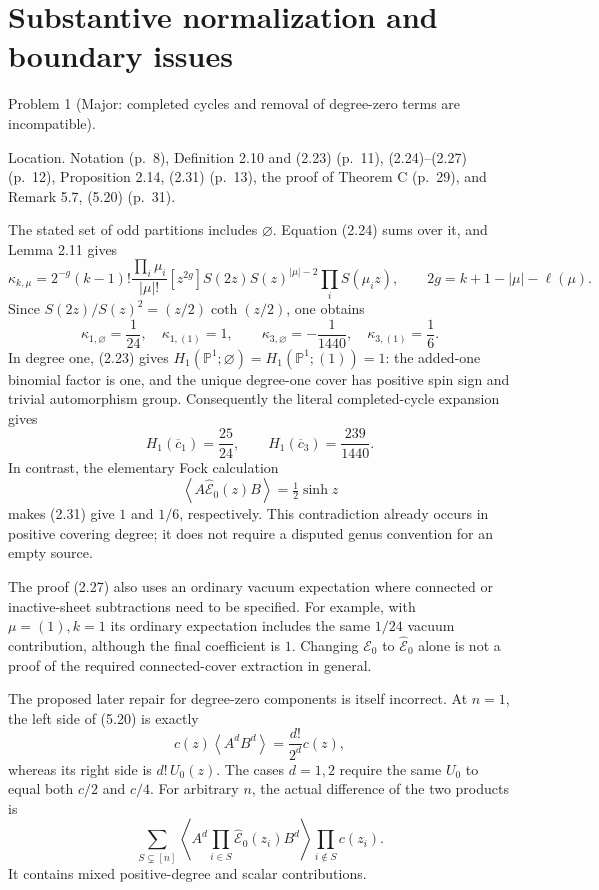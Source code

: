 \documentclass[10pt]{article}
\begin{document}
\section*{Substantive normalization and boundary issues}
Problem 1 (Major: completed cycles and removal of degree-zero terms are incompatible).\par
Location. Notation (p. 8), Definition 2.10 and (2.23) (p. 11), (2.24)–(2.27) (p. 12), Proposition 2.14, (2.31) (p. 13), the proof of Theorem C (p. 29), and Remark 5.7, (5.20) (p. 31).\par
The stated set of odd partitions includes \(\varnothing\). Equation (2.24) sums over it, and Lemma 2.11 gives \[\kappa_{k,\mu}
 =2^{-g}(k-1)!\frac{\prod_i\mu_i}{|\mu|!}
 [z^{2g}]S(2z)S(z)^{|\mu|-2}\prod_iS(\mu_i z),
 \qquad 2g=k+1-|\mu|-\ell(\mu).\] Since \(S(2z)/S(z)^2=(z/2)\coth(z/2)\), one obtains \[\kappa_{1,\varnothing}=\frac1{24},\quad
 \kappa_{1,(1)}=1,\qquad
 \kappa_{3,\varnothing}=-\frac1{1440},\quad
 \kappa_{3,(1)}=\frac16.\] In degree one, (2.23) gives \(H_1(\mathbb P^1;\varnothing)=H_1(\mathbb P^1;(1))=1\): the added-one binomial factor is one, and the unique degree-one cover has positive spin sign and trivial automorphism group. Consequently the literal completed-cycle expansion gives \[H_1(\overline c_1)=\frac{25}{24},\qquad
 H_1(\overline c_3)=\frac{239}{1440}.\] In contrast, the elementary Fock calculation \[\left\langle A\widehat{\mathcal E}_0(z)B\right\rangle=\tfrac12\sinh z\] makes (2.31) give \(1\) and \(1/6\), respectively. This contradiction already occurs in positive covering degree; it does not require a disputed genus convention for an empty source.\par
The proof (2.27) also uses an ordinary vacuum expectation where connected or inactive-sheet subtractions need to be specified. For example, with \(\mu=(1),k=1\) its ordinary expectation includes the same \(1/24\) vacuum contribution, although the final coefficient is \(1\). Changing \(\mathcal E_0\) to \(\widehat{\mathcal E}_0\) alone is not a proof of the required connected-cover extraction in general.\par
The proposed later repair for degree-zero components is itself incorrect. At \(n=1\), the left side of (5.20) is exactly \[c(z)\left\langle A^dB^d\right\rangle=\frac{d!}{2^d}c(z),\] whereas its right side is \(d!\,U_0(z)\). The cases \(d=1,2\) require the same \(U_0\) to equal both \(c/2\) and \(c/4\). For arbitrary \(n\), the actual difference of the two products is \[\sum_{S\subsetneq[n]}
 \left\langle A^d\prod_{i\in S}\widehat{\mathcal E}_0(z_i)B^d\right\rangle
 \prod_{i\notin S}c(z_i).\] It contains mixed positive-degree and scalar contributions.\par
\end{document}
